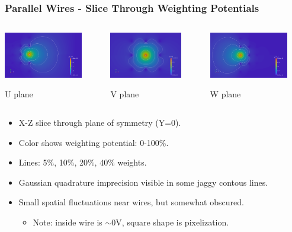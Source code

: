 \documentclass[xcolor=dvipsnames]{beamer}
\begin{document}
\begin{frame}
  \frametitle{Parallel Wires - Slice Through Weighting Potentials}
  \begin{columns}
    \begin{column}{0.3\textwidth}
      \begin{center}
        \includegraphics[height=2cm]{twodee-fine-u7.png}

        \scriptsize U plane
      \end{center}
    \end{column}
    \begin{column}{0.3\textwidth}
      \begin{center}
        \includegraphics[height=2cm]{twodee-fine-v7.png}
        
        \scriptsize V plane
      \end{center}
    \end{column}
    \begin{column}{0.3\textwidth}
      \begin{center}
        \includegraphics[height=2cm]{twodee-fine-w7.png}

        \scriptsize W plane
      \end{center}
    \end{column}
  \end{columns}

  \begin{itemize}\footnotesize
  \item X-Z slice through plane of symmetry (Y=0).
  \item Color shows weighting potential: 0-100\%.
  \item Lines: 5\%, 10\%, 20\%, 40\% weights.
  \item Gaussian quadrature imprecision visible in some jaggy contous lines.
  \item Small spatial fluctuations near wires, but somewhat obscured.
    \begin{itemize}\scriptsize
    \item Note: inside wire is $\sim$0V, square shape is pixelization.
    \end{itemize}
  \end{itemize}


\end{frame}
\end{document}
